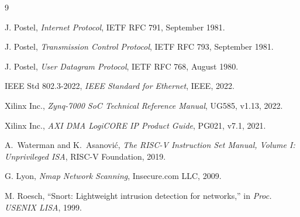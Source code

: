 \documentclass[12pt, a4paper]{report}
\begin{document}
\begin{thebibliography}{9}

J. Postel, \textit{Internet Protocol}, IETF RFC 791, September 1981.

J. Postel, \textit{Transmission Control Protocol}, IETF RFC 793, September 1981.

J. Postel, \textit{User Datagram Protocol}, IETF RFC 768, August 1980.

IEEE Std 802.3-2022, \textit{IEEE Standard for Ethernet}, IEEE, 2022.

Xilinx Inc., \textit{Zynq-7000 SoC Technical Reference Manual}, UG585, v1.13, 2022.

Xilinx Inc., \textit{AXI DMA LogiCORE IP Product Guide}, PG021, v7.1, 2021.

A.~Waterman and K.~Asanovi\'c, \textit{The RISC-V Instruction Set Manual, Volume I: Unprivileged ISA}, RISC-V Foundation, 2019.

G. Lyon, \textit{Nmap Network Scanning}, Insecure.com LLC, 2009.

M. Roesch, ``Snort: Lightweight intrusion detection for networks,'' in \textit{Proc. USENIX LISA}, 1999.

\end{thebibliography}
\end{document}

